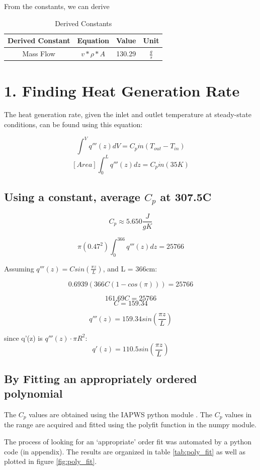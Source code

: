\documentclass[12pt,letterpaper]{article}
\begin{document}
From the constants, we can derive
\begin{table}[h]
     \centering
    \begin{tabular}{cccc}
    \hline
       Derived Constant & Equation & Value & Unit \\
    \hline
       Mass Flow & $ v * \rho * A $ & 130.29 & $\frac{g}{s}$ \\
    \hline
    \end{tabular}
    \caption {Derived Constants}
    \label{tab:der_constants}
\end{table}



\section* {1. Finding Heat Generation Rate}

The heat generation rate, given the inlet and outlet temperature
at steady-state conditions, can be found using this equation:

\[\int^{V} q'''(z) dV = C_p \dot{m} (T_{out} - T_{in})\]
\[[Area] \int^{L}_{0} q'''(z) dz = C_p \dot{m} (35 K)\]

\subsection*{Using a constant, average $C_p$ at 307.5C}
\[C_p \approx 5.650 \frac{J}{g K}\]

\[ \pi (0.47^2)  \int^{366}_{0} q'''(z) dz = 25766\]

Assuming $q'''(z) = C sin(\frac{\pi z}{L})$,
and L = 366cm:

\[ 0.6939 (366C(1-cos(\pi))) = 25766\]

\[161.69C = 25766\]
\[C = 159.34 \]

\[q'''(z) = 159.34 sin(\frac{\pi z}{L})\]

since q'(z) is $q'''(z) \cdot \pi R^2$:
\[q'(z) = 110.5 sin(\frac{\pi z}{L})\]

\subsection*{By Fitting an appropriately ordered polynomial}

The $C_p$ values are obtained using the IAPWS python
module \cite{romera_iapws:_2017}. The $C_p$ values
in the range are acquired and fitted using
the polyfit function in the numpy module.


The process of looking for an `appropriate' order fit was automated
by a python code (in appendix). The results are organized in table \ref{tab:poly_fit} as well as plotted in figure \ref{fig:poly_fit}.
\end{document}

